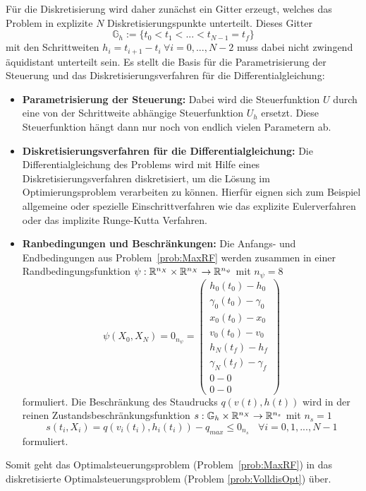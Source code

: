 Für die Diskretisierung wird daher zunächst ein Gitter erzeugt, welches das Problem in explizite $N$ Diskretisierungspunkte unterteilt. Dieses Gitter 
\[\mathbb{G}_h := \lbrace t_0 < t_1 < ... < t_{N-1} = t_f \rbrace\]
mit den Schrittweiten $h_i = t_{i+1} - t_i \ \forall i = 0,...,N-2$ muss dabei nicht zwingend äquidistant unterteilt sein. Es stellt die Basis für die Parametrisierung der Steuerung und das Diskretisierungsverfahren für die Differentialgleichung:
\begin{itemize}
    \item \textbf{Parametrisierung der Steuerung:} Dabei wird die Steuerfunktion $U$ durch eine von der Schrittweite abhängige Steuerfunktion $U_h$ ersetzt. Diese Steuerfunktion hängt dann nur noch von endlich vielen Parametern ab.

    \item \textbf{Diskretisierungsverfahren für die Differentialgleichung:} Die Differentialgleichung des Problems wird mit Hilfe eines Diskretisierungsverfahren diskretisiert, um die Lösung im Optimierungsproblem verarbeiten zu können. Hierfür eignen sich zum Beispiel allgemeine oder spezielle Einschrittverfahren wie das explizite Eulerverfahren oder das implizite Runge-Kutta Verfahren.

    \item \textbf{Ranbedingungen und Beschränkungen:} Die Anfangs- und Endbedingungen aus Problem~\ref{prob:MaxRF} werden zusammen in einer Randbedingungsfunktion $\psi : \mathbb{R}^{n_X} \times \mathbb{R}^{n_X} \to \mathbb{R}^{n_{\psi}}$ mit $n_{\psi} = 8$
    \[\psi(X_0,X_N) = 0_{n_{\psi}} = 
    \begin{pmatrix}
        h_0(t_0) - h_0 \\ 
        \gamma_0(t_0) - \gamma_0 \\
        x_0(t_0) - x_0 \\ 
        v_0(t_0) - v_0 \\ 
        h_N(t_f) - h_f \\ 
        \gamma_N(t_f) - \gamma_f \\
        0 - 0 \\ 
        0 - 0
    \end{pmatrix}\] formuliert. Die Beschränkung des Staudrucks $q(v(t),h(t))$ wird in der reinen Zustandsbeschränkungsfunktion $s : \mathbb{G}_h \times \mathbb{R}^{n_X} \to \mathbb{R}^{n_s}$ mit $n_s = 1$
    \[s(t_i,X_i) = q(v_i(t_i),h_i(t_i)) - q_{max} \leq 0_{n_s} \ \ \ \ \forall i = 0,1,...,N-1\] formuliert.
\end{itemize}
Somit geht das Optimalsteuerungsproblem (Problem~\ref{prob:MaxRF}) in das diskretisierte Optimalsteuerungsproblem (Problem \ref{prob:VolldisOpt}) über.

